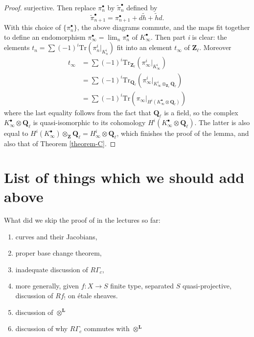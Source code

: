 \documentclass{stacks-project}
\theoremstyle{plain}
\theoremstyle{definition}
\theoremstyle{remark}
\numberwithin{equation}{subsection}
\def\lim{\mathop{\mathrm{lim}}\nolimits}
\begin{document}
\begin{proof}
surjective. Then replace $\pi_n^\bullet$ by $\tilde\pi_n^\bullet$ defined by
$$
\tilde\pi_{n+1}^\bullet = \pi_{n+1}^\bullet + d\tilde h+\tilde hd.
$$
With this choice of $\{\pi_n^\bullet\}$, the above diagrams commute, and the
maps fit together to define an endomorphism $\pi_\infty^\bullet =
\lim_n\pi_n^\bullet$ of $K_\infty^\bullet$. Then part {\it i} is clear:
the elements $t_n = \sum(-1)^i \text{Tr}\left(\pi_n^i |_{K_n^i}\right)$
fit into an element $t_\infty$ of $\mathbf{Z}_\ell$. Moreover
\begin{align*}
t_\infty
& =
\sum (-1)^i \text{Tr}_{\mathbf{Z}_\ell}(\pi_\infty^i |_{K_\infty^i}) \\
& =
\sum (-1)^i \text{Tr}_{\mathbf{Q}_\ell}(
\pi_\infty^i |_{K_\infty^i \otimes_{\mathbf{Z}_\ell}\mathbf{Q}_\ell}) \\
& =
\sum (-1)^i \text{Tr}(
\pi_\infty |_{H^i(K_\infty^\bullet \otimes \mathbf{Q}_\ell)})
\end{align*}
where the last equality follows from the fact that $\mathbf{Q}_\ell$ is a
field, so the complex $K_\infty^\bullet \otimes \mathbf{Q}_\ell$ is
quasi-isomorphic to its cohomology
$H^i(K_\infty^\bullet \otimes \mathbf{Q}_\ell)$. The latter is also equal to
$H^i(K_\infty^\bullet)\otimes_{\mathbf{Z}}\mathbf{Q}_\ell = H_\infty^i \otimes
\mathbf{Q}_\ell$, which finishes the proof of the lemma, and also that of
Theorem \ref{theorem-C}.
\end{proof}




\section{List of things which we should add above}
\label{section-list-skipped}

\noindent
What did we skip the proof of in the lectures so far:
\begin{enumerate}
\item curves and their Jacobians,
\item proper base change theorem,
\item inadequate discussion of $R\Gamma_c$,
\item more generally, given $f : X \to S$ finite type,
separated $S$ quasi-projective, discussion of $Rf_!$ on \'etale sheaves.
\item discussion of $\otimes^{\mathbf{L}}$
\item discussion of why $R\Gamma_c$ commutes with $\otimes^{\mathbf{L}}$
\end{enumerate}
\end{document}
